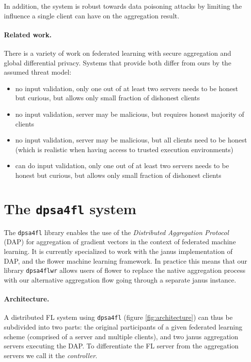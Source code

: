 \documentclass{article}
\begin{document}
In addition, the system is robust towards data poisoning attacks by limiting the influence a single client can have on the aggregation result.

\paragraph{Related work.}
There is a variety of work on federated learning with secure aggregation and global differential privacy. Systems that provide both differ from ours by the assumed threat model:
\begin{itemize}
\item\cite{dprio} no input validation, only one out of at least two servers needs to be honest but curious, but allows only small fraction of dishonest clients
\item\cite{Stevens2021EfficientDP} no input validation, server may be malicious, but requires honest majority of clients
\item\cite{Kairouz2021TheDD} no input validation, server may be malicious, but all clients need to be honest (which is realistic when having access to trusted execution environments)
\item\cite{acorn} can do input validation, only one out of at least two servers needs to be honest but curious, but allows only small fraction of dishonest clients
\end{itemize}

\section{The \texttt{dpsa4fl} system}
The \texttt{dpsa4fl} library enables the use of the \textit{Distributed Aggregation Protocol} (DAP) for
aggregation of gradient vectors in the context of federated machine learning. It
is currently specialized to work with the janus implementation of DAP,
and the flower machine learning framework.
In practice this means that our library \texttt{dpsa4flwr} allows users of flower
to replace the native aggregation process with our alternative aggregation flow
going through a separate janus instance.

\paragraph{Architecture.}
A distributed FL system using \texttt{dpsa4fl} (figure \ref{fig:architecture}) can thus be
subdivided into two parts: the original participants of a given federated
learning scheme (comprised of a server and multiple clients), and two
janus aggregation servers executing the DAP. To differentiate the FL server from
the aggregation servers we call it the \textit{controller}.
\end{document}
